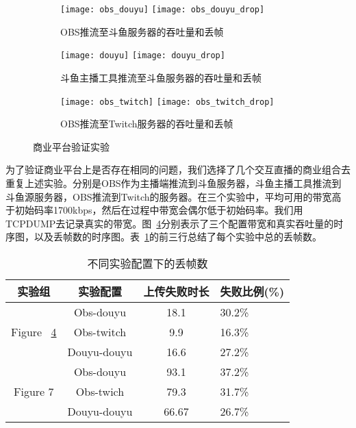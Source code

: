 \begin{figure}[htb]
  \centering%
  \begin{subfigure}{\textwidth}
    \texttt{[image: obs\_douyu]}
    \texttt{[image: obs\_douyu\_drop]}
    \caption{OBS推流至斗鱼服务器的吞吐量和丢帧}
    \label{fig:obs_douyu}
  \end{subfigure}%
  \vfill
  \vspace{0.2in}
  \begin{subfigure}{\textwidth}
    \texttt{[image: douyu]}
    \texttt{[image: douyu\_drop]}
    \caption{斗鱼主播工具推流至斗鱼服务器的吞吐量和丢帧}
    \label{fig:douyu}
  \end{subfigure}
  \vfill
  \vspace{0.2in}
  \begin{subfigure}{\textwidth}
    \texttt{[image: obs\_twitch]}
    \texttt{[image: obs\_twitch\_drop]}
    \caption{OBS推流至Twitch服务器的吞吐量和丢帧}
    \label{fig:twitch}
  \end{subfigure}
  \caption{商业平台验证实验}
  \label{fig:commerical_application}
\end{figure}

为了验证商业平台上是否存在相同的问题，我们选择了几个交互直播的商业组合去重复上述实验。分别是OBS作为主播端推流到斗鱼服务器，斗鱼主播工具推流到斗鱼源服务器，OBS推流到Twitch的服务器。在三个实验中，平均可用的带宽高于初始码率1700kbps，然后在过程中带宽会偶尔低于初始码率。我们用TCPDUMP去记录真实的带宽。图~\ref{fig:commerical_application}分别表示了三个配置带宽和真实吞吐量的时序图，以及丢帧数的时序图。表~\ref{tb:drop}的前三行总结了每个实验中总的丢帧数。

\begin{table}[htb]
\centering
\caption{不同实验配置下的丢帧数}
\label{tb:drop}
{\setlength{\tabcolsep}{2pt}
\begin{tabular}{|c|c|c|l|}
\hline
\textbf{实验组} & \textbf{实验配置} & \textbf{上传失败时长} & \textbf{失败比例(\%)}   \\ \hline
\multirow{3}{*}{Figure ~\ref{fig:commerical_application}}&  Obs-douyu               & 18.1         & 30.2\%                           \\ \cline{2-4}
& Obs-twitch              & 9.9        & 16.3\%    \\ \cline{2-4}
& Douyu-douyu            & 16.6      & 27.2\% \\ \hline
\multirow{4}{*}{Figure 7} & Obs-douyu            & 93.1      & 37.2\%     \\ \cline{2-4}
& Obs-twich             & 79.3      & 31.7\%  \\ \cline{2-4}
& Douyu-douyu             & 66.67         & 26.7\%  \\ \hline
\end{tabular}}
\end{table}

